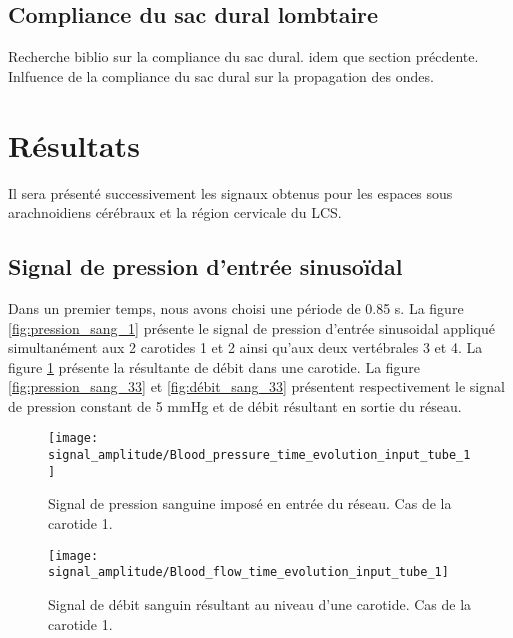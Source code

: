 \documentclass[french]{report}
\begin{document}
\subsection{Compliance du sac dural lombtaire}

Recherche biblio sur la compliance du sac dural.
idem que section précdente. Inlfuence de la compliance du sac dural sur la propagation des ondes.

\section{Résultats}

Il sera présenté successivement les signaux obtenus pour les espaces sous arachnoidiens cérébraux et la région cervicale du LCS.

\subsection{Signal de pression d'entrée sinusoïdal}

Dans un premier temps, nous avons choisi une période de 0.85 s. La figure \ref{fig:pression_sang_1} présente le signal de pression d'entrée sinusoidal appliqué simultanément aux 2 carotides 1 et 2 ainsi qu'aux deux vertébrales 3 et 4. La figure \ref{fig:débit_sang_1} présente la résultante de débit dans une carotide.
La figure \ref{fig:pression_sang_33} et \ref{fig:débit_sang_33} présentent respectivement le signal de pression constant de 5 mmHg et de débit résultant en sortie du réseau.

\begin{figure}
  \begin{minipage}{0.5\linewidth}
    \centering
    \texttt{[image: signal\_amplitude/Blood\_pressure\_time\_evolution\_input\_tube\_1]}
    \caption{Signal de pression sanguine imposé en entrée du réseau. Cas de la carotide 1.}
    \label{fig:pression_sang_1}
  \end{minipage}
  \hspace{0.5cm}
  \begin{minipage}{0.5\linewidth}
    \centering
    \texttt{[image: signal\_amplitude/Blood\_flow\_time\_evolution\_input\_tube\_1]}
    \caption{Signal de débit sanguin résultant au niveau d'une carotide. Cas de la carotide 1.}
    \label{fig:débit_sang_1}
  \end{minipage}
\end{figure}
\end{document}
